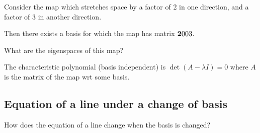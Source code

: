 
\newpage
Consider the map which stretches space by a factor of 2 in one direction, and a
factor of 3 in another direction.

Then there exists a basis for which the map has matrix
$
\mathbf{2}{0}
    {0}{3}
$.

What are the eigenspaces of this map?

The characteristic polynomial (basis independent) is $\det(A - \lambda I) = 0$
where $A$ is the matrix of the map wrt some basis.


\subsection{Equation of a line under a change of basis}
\begin{question*}
  How does the equation of a line change when the basis is changed?
\end{question*}

